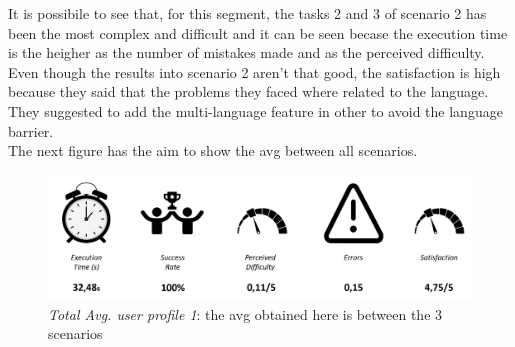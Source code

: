 {\vspace{1cm}
}It is possibile to see that, for this segment, the tasks 2 and 3 of scenario 2 has been the most complex and difficult and it can be seen becase the execution time is the heigher as the number of mistakes made and as the perceived difficulty. Even though the results into scenario 2 aren't that good, the satisfaction is high because they said that the problems they faced where related to the language. They suggested to add the multi-language feature in other to avoid the language barrier.\\
The next figure has the aim to show the avg between all scenarios.

\begin{figure}[h!]
	\centering
	\begin{minipage}[b]{1\textwidth}
    		\includegraphics[width=\textwidth]{./assets/avg-1.png}
		\caption{\emph{Total Avg. user profile 1}: the avg obtained here is between the 3 scenarios }
	\end{minipage}
\end{figure}
\FloatBarrier


